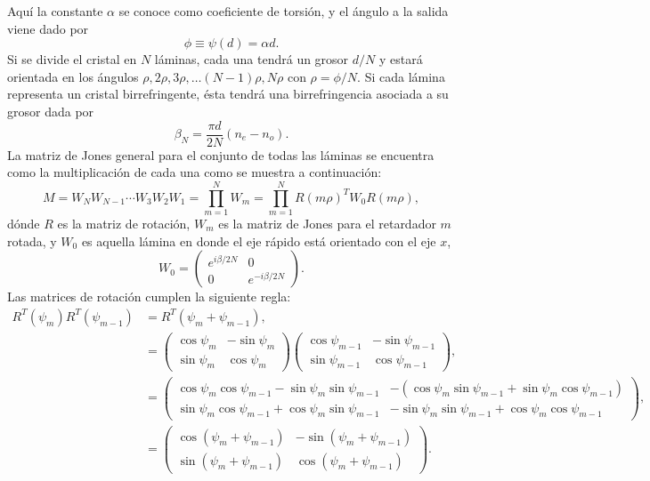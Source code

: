 Aquí la constante $\alpha$
se conoce como coeficiente de torsión, y el ángulo a la salida viene
dado por $$\phi \equiv \psi(d)=\alpha d.$$ Si se divide el cristal en
$N$ láminas, cada una tendrá un grosor $d/N$ y estará orientada en los ángulos
$\rho,2\rho,3\rho,\dots\left(N-1\right)\rho,N\rho$ con
$\rho=\phi/N$. Si cada lámina representa un cristal birrefringente, ésta tendrá una
birrefringencia asociada a su grosor dada por $$\beta_N = \frac{\pi
  d}{2N}\left(n_e-n_o\right).$$
La matriz de Jones general para el conjunto de todas las láminas se
encuentra como la multiplicación de cada una como se muestra a
continuación:
\[ M= W_NW_{N-1}\cdots W_3W_2W_1=\prod_{m=1}^NW_m = \prod_{m=1}^NR(m\rho)^TW_0R(m\rho), \]
dónde $R$ es la matriz de rotación, $W_m$ es la matriz de Jones para
el retardador $m$ rotada, y $W_0$ es aquella lámina en donde el eje rápido está
orientado con el eje $x$,
\begin{equation*}
W_0 =
\begin{pmatrix}
  e^{i\beta/2N} &0 \\ 0 & e^{-i\beta/2N} 
\end{pmatrix}.
\end{equation*}
Las matrices de rotación cumplen la siguiente regla:
\begin{align*}
R^T(\psi_m)R^T(\psi_{m-1}) &= R^T\left(\psi_m+\psi_{m-1}\right),\\
&=
\begin{pmatrix}
  \cos{\psi_m}&  -\sin{\psi_m}\\  \sin{\psi_m}&  \cos{\psi_m}
\end{pmatrix}
\begin{pmatrix}
  \cos{\psi_{m-1}}&  -\sin{\psi_{m-1}}\\  \sin{\psi_{m-1}}&  \cos{\psi_{m-1}}
\end{pmatrix},\\
&=
\begin{pmatrix}
  \cos{\psi_m}\cos{\psi_{m-1}}-\sin{\psi_m}\sin{\psi_{m-1}}&  
-(\cos{\psi_m}\sin{\psi_{m-1}}+\sin{\psi_m} \cos{\psi_{m-1}})\\
  \sin{\psi_m} \cos{\psi_{m-1}}+\cos{\psi_m}\sin{\psi_{m-1}}& 
 -\sin{\psi_m}\sin{\psi_{m-1}}+\cos{\psi_m}\cos{\psi_{m-1}}
\end{pmatrix},  \\
&=\begin{pmatrix}
  \cos{\left(\psi_m+\psi_{m-1}\right)}&  -\sin{\left(\psi_m+\psi_{m-1}\right)}\\
  \sin{\left(\psi_m+\psi_{m-1}\right)}&  \cos{\left(\psi_m+\psi_{m-1}\right)} 
\end{pmatrix}.
\end{align*}
